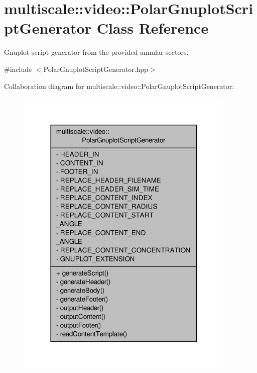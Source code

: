 \hypertarget{classmultiscale_1_1video_1_1PolarGnuplotScriptGenerator}{\section{multiscale\-:\-:video\-:\-:Polar\-Gnuplot\-Script\-Generator Class Reference}
\label{classmultiscale_1_1video_1_1PolarGnuplotScriptGenerator}
}


Gnuplot script generator from the provided annular sectors.  




{\ttfamily \#include $<$Polar\-Gnuplot\-Script\-Generator.\-hpp$>$}



Collaboration diagram for multiscale\-:\-:video\-:\-:Polar\-Gnuplot\-Script\-Generator\-:
\nopagebreak
\begin{figure}[H]
\begin{center}
\leavevmode
\includegraphics[width=298pt]{classmultiscale_1_1video_1_1PolarGnuplotScriptGenerator__coll__graph}
\end{center}
\end{figure}
